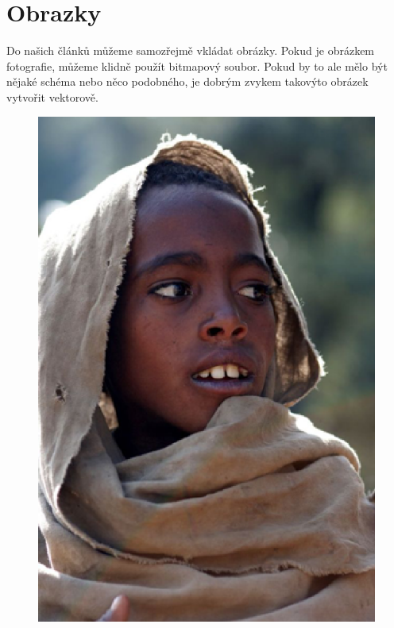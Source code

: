 \documentclass[a4paper,11pt]{article}
\begin{document}
\section{Obrazky} 
Do našich článků můžeme samozřejmě vkládat obrázky. Pokud je obrázkem fotografie,
můžeme klidně použít bitmapový soubor. Pokud by to ale mělo být nějaké schéma nebo
něco podobného, je dobrým zvykem takovýto obrázek vytvořit vektorově.
\begin{figure}[h]  
\centering
    \includegraphics[scale=0.4]{etiopan.eps}

\end{figure}
\end{document}
